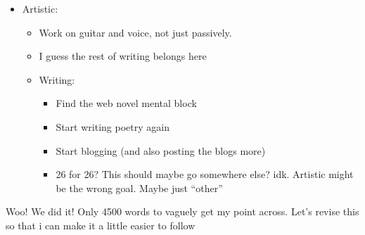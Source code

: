 \documentclass[12pt]{article}[titlepage]
\newcommand{\say}[1]{``#1''}
\renewcommand{\,}{\textsuperscript{,}}
\begin{document}
\begin{itemize}
\begin{itemize}
\begin{itemize}
\begin{itemize}
\item I think those three are good! Maybe start giving small gifts, but that's something I can do.  
\end{itemize}  
\end{itemize}  
\item Spiritual:  
\begin{itemize}  
\item Be more intentional about prayer  
\item Figure out what I want to do with my lent, and start doing that.\footnote{taking a break here for work with the group. Returning: let's keep going}  
\end{itemize}  
\end{itemize}  
\item Artistic:  
\begin{itemize}  
\item Work on guitar and voice, not just passively.  
\item I guess the rest of writing belongs here  
\item Writing:  
\begin{itemize}  
\item Find the web novel mental block  
\item Start writing poetry again  
\item Start blogging (and also posting the blogs more)  
\item 26 for 26? This should maybe go somewhere else? idk. Artistic might be the wrong goal. Maybe just \say{other}  
\end{itemize}  
\end{itemize}  
\end{itemize}

Woo! We did it! Only 4500 words to vaguely get my point across.   
Let's revise this so that i can make it a little easier to follow
\end{document}

